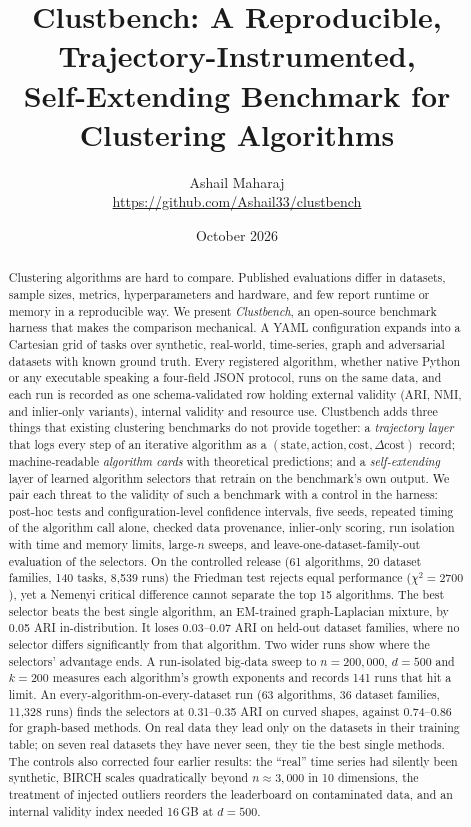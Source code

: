 \documentclass[11pt,a4paper]{article}
\title{\textbf{Clustbench: A Reproducible, Trajectory-Instrumented,\\ Self-Extending Benchmark for Clustering Algorithms}}
\author{Ashail Maharaj\\\small\url{https://github.com/Ashail33/clustbench}}
\date{October 2026}
\begin{document}
\maketitle

\begin{abstract}
Clustering algorithms are hard to compare. Published evaluations differ in
datasets, sample sizes, metrics, hyperparameters and hardware, and few report
runtime or memory in a reproducible way. We present \emph{Clustbench}, an
open-source benchmark harness that makes the comparison mechanical. A YAML
configuration expands into a Cartesian grid of tasks over synthetic,
real-world, time-series, graph and adversarial datasets with known ground
truth. Every registered algorithm, whether native Python or any executable
speaking a four-field JSON protocol, runs on the same data, and each run is
recorded as one schema-validated row holding external validity (ARI, NMI,
and inlier-only variants), internal validity and resource use. Clustbench adds
three things that existing clustering benchmarks do not provide together: a
\emph{trajectory layer} that logs every step of an iterative algorithm as a
$(\text{state}, \text{action}, \text{cost}, \Delta\text{cost})$ record;
machine-readable \emph{algorithm cards} with theoretical predictions; and a
\emph{self-extending} layer of learned algorithm selectors that retrain on the
benchmark's own output. We pair each threat to the validity of such a
benchmark with a control in the harness: post-hoc tests and
configuration-level confidence intervals, five seeds, repeated timing of the
algorithm call alone, checked data provenance, inlier-only scoring, run
isolation with time and memory limits, large-$n$ sweeps, and
leave-one-dataset-family-out evaluation of the selectors. On the controlled
release (61 algorithms, 20 dataset families, 140 tasks, 8{,}539 runs) the
Friedman test rejects equal performance ($\chi^2 = 2700$), yet a Nemenyi
critical difference cannot separate the top 15 algorithms. The best selector
beats the best single algorithm, an EM-trained graph-Laplacian mixture, by
0.05 ARI in-distribution. It loses 0.03--0.07 ARI on held-out dataset
families, where no selector differs significantly from that algorithm. Two
wider runs show where the selectors' advantage ends. A run-isolated big-data
sweep to $n = 200{,}000$, $d = 500$ and $k = 200$ measures each algorithm's
growth exponents and records 141 runs that hit a limit. An
every-algorithm-on-every-dataset run (63 algorithms, 36 dataset families,
11{,}328 runs) finds the selectors at 0.31--0.35 ARI on curved shapes, against
0.74--0.86 for graph-based methods. On real data they lead only on the
datasets in their training table; on seven real datasets they have never
seen, they tie the best single methods. The
controls also corrected four earlier results: the ``real'' time series had
silently been synthetic, BIRCH scales quadratically beyond
$n \approx 3{,}000$ in 10 dimensions, the treatment of injected outliers
reorders the leaderboard on contaminated data, and an internal validity index
needed 16\,GB at $d = 500$.
\end{abstract}
\end{document}
